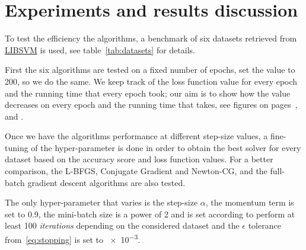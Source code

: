 \section{Experiments and results discussion}\label{sc:exp}




To test the efficiency the algorithms, a benchmark of six datasets retrieved from \href{https://www.csie.ntu.edu.tw/~cjlin/libsvmtools/datasets/}{LIBSVM} is used, see table~\vref{tab:datasets} for details.

First the six algorithms are tested on a fixed number of epochs, \textcite{fan_msl_2023} set the value to \num{200}, so we do the same. We keep track of the loss function value for every epoch and the running time that every epoch took; our aim is to show how the value decreases on every epoch and the running time that takes, see figures on pages~\pageref{fig:diab-breast}, \pageref{fig:phish-austr} and \pageref{fig:mush-german}.\par\smallskip

Once we have the algorithms performance at different step-size values, a fine-tuning of the hyper-parameter is done in order to obtain the best solver for every dataset based on the accuracy score and loss function values. For a better comparison, the L-BFGS, Conjugate Gradient and Newton-CG, and the full-batch gradient descent algorithms are also tested.

The only hyper-parameter that varies is the step-size $\alpha$, the momentum term is set to \num{0.9}, the mini-batch size is a power of 2 and is set according to perform at least \num{100} \emph{iterations} depending on the considered dataset and the $\epsilon$ tolerance from~\eqref{eq:stopping} is set to \num{e-3}.


